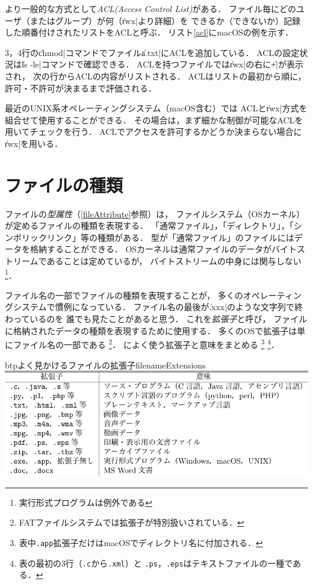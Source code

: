 より一般的な方式として\emph{ACL(Access Control List)}がある．
ファイル毎にどのユーザ（またはグループ）が何（\|rwx|より詳細）を
できるか（できないか）記録した順番付けされたリストをACLと呼ぶ．
リスト\ref{acl}にmacOSの例を示す．



3，4行の\|chmod|コマンドでファイル\|a.txt|にACLを追加している．
ACLの設定状況は\|ls -le|コマンドで確認できる．
ACLを持つファイルでは\|rwx|の右に\|+|が表示され，
次の行からACLの内容がリストされる．
ACLはリストの最初から順に，
許可・不許可が決まるまで評価される．

最近のUNIX系オペレーティングシステム（macOS含む）では
ACLと\|rwx|方式を組合せて使用することができる．
その場合は，まず細かな制御が可能なACLを用いてチェックを行う．
ACLでアクセスを許可するかどうか決まらない場合に\|rwx|を用いる．

\section{ファイルの種類}
ファイルの\emph{型属性}（\ref{fileAttribute}参照）は，
ファイルシステム（OSカーネル）が定めるファイルの種類を表現する．
「通常ファイル」，「ディレクトリ」，「シンボリックリンク」等の種類がある．
型が「通常ファイル」のファイルにはデータを格納することができる．
OSカーネルは通常ファイルのデータがバイトストリームであることは定めているが，
バイトストリームの中身には関与しない\footnote{実行形式プログラムは例外である}．

ファイル名の一部でファイルの種類を表現することが，
多くのオペレーティングシステムで慣例になっている．
ファイル名の最後が\|.xxx|のような文字列で終わっているのを
誰でも見たことがあると思う．
これを\emph{拡張子}と呼び，
ファイルに格納されたデータの種類を表現するために使用する．
多くのOSで拡張子は単にファイル名の一部である
\footnote{FATファイルシステムでは拡張子が特別扱いされている．}．
によく使う拡張子と意味をまとめる
\footnote{表中\texttt{.app}拡張子だけはmacOSでディレクトリ名に付加される．}
\footnote{表の最初の3行（\texttt{.c}から\texttt{.xml}）と
  \texttt{.ps}，\texttt{.eps}はテキストファイルの一種である．}．

\begin{mytable}{btp}{よく見かけるファイルの拡張子}{filenameExtensions}
  \includegraphics[scale=1.0]{Tbl/filenameExtensions.pdf}
\end{mytable}

